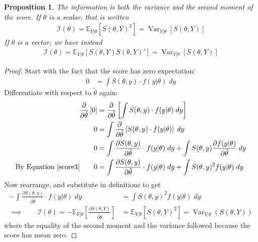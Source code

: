 \documentclass[12pt]{article}
\theoremstyle{plain}
\newtheorem{prop}[thm]{Proposition}
\theoremstyle{definition}
\theoremstyle{remark}
\newcommand{\calI}{\mathcal{I}}
\newcommand{\E}{\mathbb{E}}
\newcommand{\Var}{\operatorname{Var}}
\begin{document}
\begin{prop}
The information is both the variance and the second moment of the score.
If $\theta$ is a scalar, that is written
\begin{align*}
  \calI(\theta)
  = \E_{Y|\theta}[S(\theta,Y)^2]
  = \Var_{Y|\theta}[S(\theta,Y)]
\end{align*}
If $\theta$ is a vector, we have instead
\begin{align*}
  \calI(\theta)
  = \E_{Y|\theta}\left[S(\theta,Y)S(\theta,Y)'\right]
  = \Var_{Y|\theta}[S(\theta,Y)]
\end{align*}
\end{prop}
\begin{proof}
Start with the fact that the score has zero expectation:
\begin{align*}
  0
  &= \int S(\theta,y)\cdot f(y|\theta) \; dy
\end{align*}
Differentiate with respect to $\tilde{\theta}$ again:
\begin{align*}
  \frac{\partial}{\partial\tilde{\theta}}
  \left[ 0 \right]
  &=
  \frac{\partial}{\partial\tilde{\theta}}
  \left[
    \int S(\theta,y)\cdot f(y|\theta) \; dy
  \right] \\
  0
  &=
  \int
  \frac{\partial}{\partial\tilde{\theta}}
  \left[
    S(\theta,y)\cdot f(y|\theta)
  \right]\; dy
   \\
  0 &=
  \int
  \frac{\partial S(\theta,y)}{\partial\tilde{\theta}}
  \cdot f(y|\theta)
  \; dy
  +
  \int
  S(\theta,y)
  \frac{\partial f(y|\theta)}{\partial\tilde{\theta}} \; dy \\
  \text{By Equation~\ref{score3}}
  \qquad
  0 &=
  \int
  \frac{\partial S(\theta,y)}{\partial\tilde{\theta}}
  \cdot f(y|\theta)
  \; dy
  +
  \int
  S(\theta,y)^2 f(y|\theta) \; dy
\end{align*}
Now rearrange, and substitute in definitions to get
\begin{align*}
  -\int
  \frac{\partial S(\theta,y)}{\partial\tilde{\theta}}
  \cdot f(y|\theta)
  \; dy
  &=
  \int
  S(\theta,y)^2 f(y|\theta) \; dy \\
  \implies\qquad
  \calI(\theta)
  =
  -\E_{Y|\theta}\left[
    \frac{\partial S(\theta,Y)}{\partial \tilde{\theta}}
  \right]
  &=
  \E_{Y|\theta}[S(\theta,Y)^2]
  = \Var_{Y|\theta}(S(\theta,Y))
\end{align*}
where the equality of the second moment and the variance followed
because the score has mean zero.
\end{proof}
\end{document}
